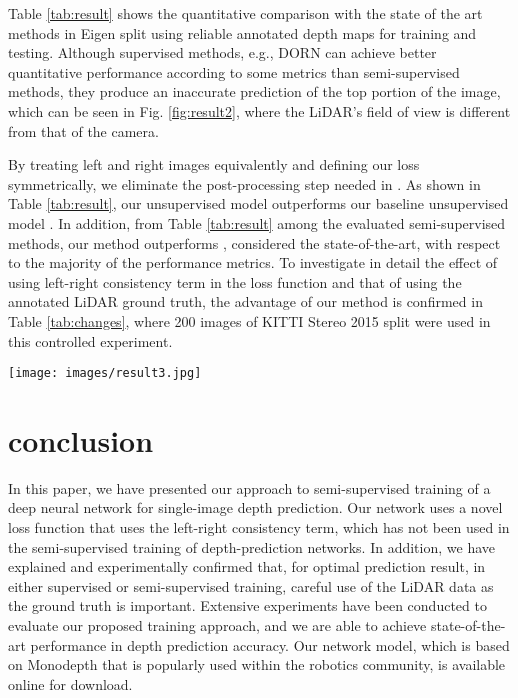 \documentclass[letterpaper, 10 pt, conference]{ieeeconf}
\begin{document}
Table \ref{tab:result} shows the quantitative comparison with the state of the art methods in Eigen split using reliable annotated depth maps for training and testing. Although supervised methods, e.g., DORN\cite{fu2018deep} can achieve better quantitative performance according to some metrics than semi-supervised methods, they produce an inaccurate prediction of the top portion of the image, which can be seen in Fig. \ref{fig:result2}, where the LiDAR's field of view is different from that of the camera.

By treating left and right images equivalently and defining our loss symmetrically, we eliminate the post-processing step needed in \cite{godard2017unsupervised}. As shown in Table \ref{tab:result}, our unsupervised model outperforms our baseline unsupervised model \cite{godard2017unsupervised}. In addition, from Table \ref{tab:result} among the evaluated semi-supervised methods, our method outperforms \cite{kuznietsov2017semi}, considered the state-of-the-art, with respect to the majority of the performance metrics. To investigate in detail the effect of using left-right consistency term in the loss function and that of using the annotated LiDAR ground truth, the advantage of our method is confirmed in Table \ref{tab:changes}, where 200 images of KITTI Stereo 2015 split\cite{Menze2018JPRS} were used in this controlled experiment.
 
 \begin{figure*} [!h]
        \centering
        \texttt{[image: images/result3.jpg]}
        \caption{Qualitative comparison between state-of-the-art methods. We use interpolation in ground truth for visualization purpose.}
        \label{fig:result2}
    \end{figure*}
    
    
\section{conclusion}
In this paper, we have presented our approach to semi-supervised training of a deep neural network for single-image depth prediction.  Our network uses a novel loss function that uses the left-right consistency term, which has not been used in the semi-supervised training of depth-prediction networks. In addition, we have explained and experimentally confirmed that, for optimal prediction result, in either supervised or semi-supervised training, careful use of the LiDAR data as the ground truth is important. Extensive experiments have been conducted to evaluate our proposed training approach, and we are able to achieve state-of-the-art performance in depth prediction accuracy.  Our network model, which is based on Monodepth that is popularly used within the robotics community, is available online for download.
\end{document}
